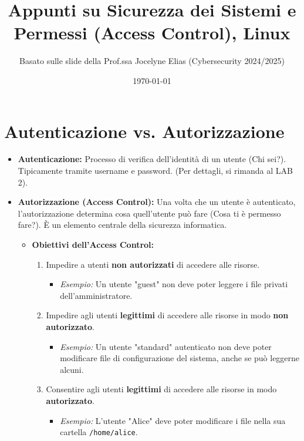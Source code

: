\documentclass{article}
\title{Appunti su Sicurezza dei Sistemi e Permessi (Access Control), Linux}
\author{Basato sulle slide della Prof.ssa Jocelyne Elias (Cybersecurity 2024/2025)}
\date{\today}
\begin{document}
\maketitle
\tableofcontents
\newpage

\section{Autenticazione vs. Autorizzazione}
\begin{itemize}
    \item \textbf{Autenticazione:} Processo di verifica dell'identità di un utente (Chi sei?). Tipicamente tramite username e password. (Per dettagli, si rimanda al LAB 2).
    \item \textbf{Autorizzazione (Access Control):} Una volta che un utente è autenticato, l'autorizzazione determina cosa quell'utente può fare (Cosa ti è permesso fare?). È un elemento centrale della sicurezza informatica.
    \begin{itemize}
        \item \textbf{Obiettivi dell'Access Control:}
        \begin{enumerate}
            \item Impedire a utenti \textbf{non autorizzati} di accedere alle risorse.
            \begin{itemize}
                \item \textit{Esempio:} Un utente "guest" non deve poter leggere i file privati dell'amministratore.
            \end{itemize}
            \item Impedire agli utenti \textbf{legittimi} di accedere alle risorse in modo \textbf{non autorizzato}.
            \begin{itemize}
                \item \textit{Esempio:} Un utente "standard" autenticato non deve poter modificare file di configurazione del sistema, anche se può leggerne alcuni.
            \end{itemize}
            \item Consentire agli utenti \textbf{legittimi} di accedere alle risorse in modo \textbf{autorizzato}.
            \begin{itemize}
                \item \textit{Esempio:} L'utente "Alice" deve poter modificare i file nella sua cartella \texttt{/home/alice}.
            \end{itemize}
        \end{enumerate}
    \end{itemize}
\end{itemize}
\end{document}
